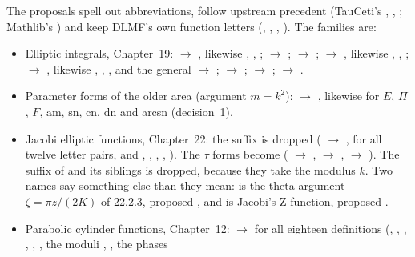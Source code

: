 \documentclass[11pt,a4paper]{article}
\begin{document}
The proposals spell out abbreviations, follow upstream precedent (TauCeti's
, , ; Mathlib's
) and keep DLMF's own function letters (, ,
, ). The families are:
\begin{itemize}
  \item Elliptic integrals, Chapter~19:  $\to$ ,
    likewise , , ;  $\to$
    ;  $\to$ ;
     $\to$ , likewise , ,
    ;  $\to$ , likewise ,
    , ,  and the general  $\to$
    ;  $\to$ ;
     $\to$ ;  $\to$
    .
  \item Parameter forms of the older  area (argument $m=k^2$):
     $\to$ , likewise for $E$, $\Pi$,
    $F$, $\mathrm{am}$, $\mathrm{sn}$, $\mathrm{cn}$, $\mathrm{dn}$ and arcsn (decision~1).
  \item Jacobi elliptic functions, Chapter~22: the suffix  is dropped
    ( $\to$ , for all twelve letter pairs, and
    , , , ,
    ). The $\tau$ forms become  (
    $\to$ ,  $\to$ ,
     $\to$ ). The suffix  of
     and its siblings is dropped, because they take
    the modulus $k$. Two names say something else than they mean:  is the
    theta argument $\zeta=\pi z/(2K)$ of 22.2.3, proposed , and
     is Jacobi's $\mathrm{Z}$ function, proposed .
  \item Parabolic cylinder functions, Chapter~12:  $\to$
     for all eighteen definitions (, , ,
    , , , the moduli , , the phases

\end{itemize}
\end{document}
